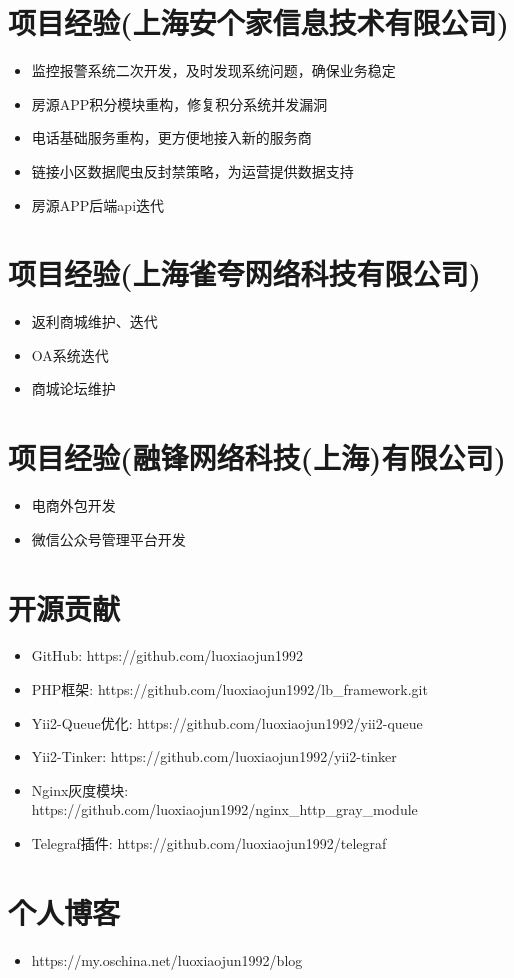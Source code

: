 \documentclass[a4paper,12pt]{article}
\begin{document}
\begin{CJK}{UTF8}{gbsn}
		\section{项目经验(上海安个家信息技术有限公司)}
			\begin{itemize}
				\item{监控报警系统二次开发，及时发现系统问题，确保业务稳定}
				\item{房源APP积分模块重构，修复积分系统并发漏洞}
				\item{电话基础服务重构，更方便地接入新的服务商}
				\item{链接小区数据爬虫反封禁策略，为运营提供数据支持}
				\item{房源APP后端api迭代}
			\end{itemize}
		
		\section{项目经验(上海雀夸网络科技有限公司)}
			\begin{itemize}
				\item{返利商城维护、迭代}
				\item{OA系统迭代}
				\item{商城论坛维护}
			\end{itemize}
			
		\section{项目经验(融锋网络科技(上海)有限公司)}
			\begin{itemize}
				\item{电商外包开发}
				\item{微信公众号管理平台开发}
			\end{itemize}
		
		\section{开源贡献}
		 	\begin{itemize}
				\item{GitHub: https://github.com/luoxiaojun1992}
				\item{PHP框架: https://github.com/luoxiaojun1992/lb\_framework.git}
				\item{Yii2-Queue优化: https://github.com/luoxiaojun1992/yii2-queue}
				\item{Yii2-Tinker: https://github.com/luoxiaojun1992/yii2-tinker}
				\item{Nginx灰度模块: https://github.com/luoxiaojun1992/nginx\_http\_gray\_module}
				\item{Telegraf插件: https://github.com/luoxiaojun1992/telegraf}
			\end{itemize}
		
		\section{个人博客}
			\begin{itemize}
				\item{https://my.oschina.net/luoxiaojun1992/blog}
			\end{itemize}

	\end{CJK}
\end{document}
